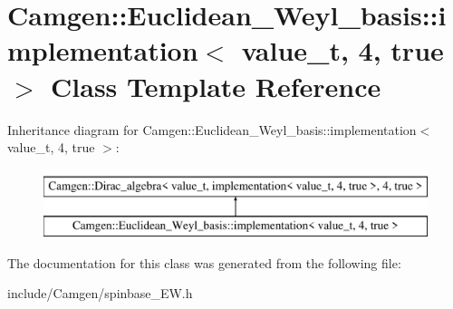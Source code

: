 \hypertarget{a00300}{\section{Camgen\-:\-:Euclidean\-\_\-\-Weyl\-\_\-basis\-:\-:implementation$<$ value\-\_\-t, 4, true $>$ Class Template Reference}
\label{a00300}
}
Inheritance diagram for Camgen\-:\-:Euclidean\-\_\-\-Weyl\-\_\-basis\-:\-:implementation$<$ value\-\_\-t, 4, true $>$\-:\begin{figure}[H]
\begin{center}
\leavevmode
\includegraphics[height=2.000000cm]{a00300}
\end{center}
\end{figure}


The documentation for this class was generated from the following file\-:\begin{DoxyCompactItemize}
\item 
include/\-Camgen/spinbase\-\_\-\-E\-W.\-h\end{DoxyCompactItemize}
